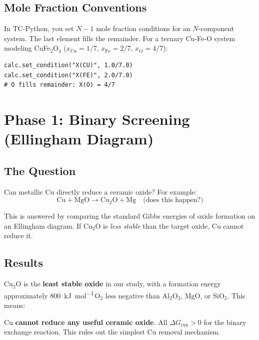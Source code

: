 \documentclass[11pt]{article}
\begin{document}
\subsection{Mole Fraction Conventions}

In TC-Python, you set $N-1$ mole fraction conditions for an $N$-component system. The last element fills the remainder. For a ternary Cu-Fe-O system modeling CuFe$_2$O$_4$ ($x_{\text{Cu}} = 1/7$, $x_{\text{Fe}} = 2/7$, $x_{\text{O}} = 4/7$):

\begin{lstlisting}
calc.set_condition("X(CU)", 1.0/7.0)
calc.set_condition("X(FE)", 2.0/7.0)
# O fills remainder: X(O) = 4/7
\end{lstlisting}


\section{Phase 1: Binary Screening (Ellingham Diagram)}

\subsection{The Question}

Can metallic Cu directly reduce a ceramic oxide? For example:
\[
    \text{Cu} + \text{MgO} \to \text{Cu}_2\text{O} + \text{Mg} \quad \text{(does this happen?)}
\]

This is answered by comparing the standard Gibbs energies of oxide formation on an Ellingham diagram. If Cu$_2$O is \textit{less stable} than the target oxide, Cu cannot reduce it.

\subsection{Results}

Cu$_2$O is the \textbf{least stable oxide} in our study, with a formation energy approximately \SI{800}{\kilo\joule\per\mole}\,O$_2$ less negative than Al$_2$O$_3$, MgO, or SiO$_2$. This means:

\begin{insight}
Cu \textbf{cannot reduce any useful ceramic oxide}. All $\Delta G_{\text{rxn}} > 0$ for the binary exchange reaction. This rules out the simplest Cu removal mechanism.
\end{insight}
\end{document}
